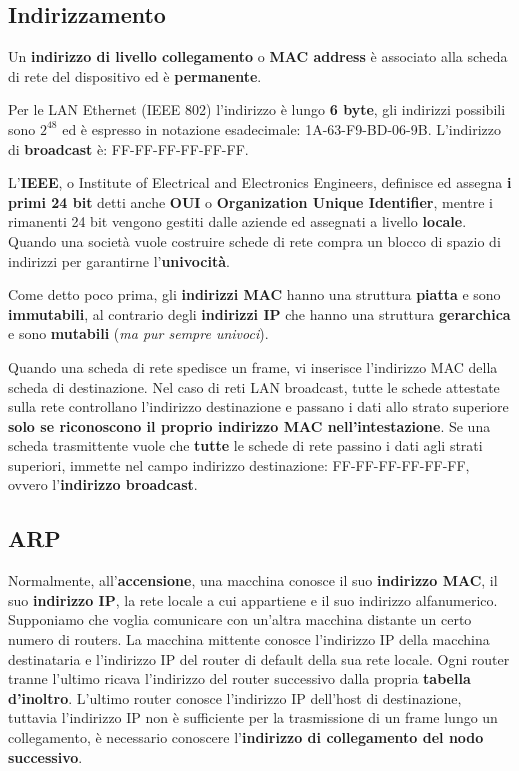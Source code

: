 \documentclass[11pt,a4paper,oneside]{book}
\theoremstyle{definition}
\begin{document}
\pagebreak

\subsection{Indirizzamento}

Un \textbf{indirizzo di livello collegamento} o \textbf{MAC address} è associato alla scheda di rete del dispositivo ed è \textbf{permanente}.

Per le LAN Ethernet (IEEE 802) l'indirizzo è lungo \textbf{6 byte}, gli indirizzi possibili sono $2^{48}$ ed è espresso in notazione esadecimale: 1A-63-F9-BD-06-9B. L'indirizzo di \textbf{broadcast} è: FF-FF-FF-FF-FF-FF.

L'\textbf{IEEE}, o Institute of Electrical and Electronics Engineers, definisce ed assegna \textbf{i primi 24 bit} detti anche \textbf{OUI} o \textbf{Organization Unique Identifier}, mentre i rimanenti 24 bit vengono gestiti dalle aziende ed assegnati a livello \textbf{locale}. Quando una società vuole costruire schede di rete compra un blocco di spazio di indirizzi per garantirne l'\textbf{univocità}.

Come detto poco prima, gli \textbf{indirizzi MAC} hanno una struttura \textbf{piatta} e sono \textbf{immutabili}, al contrario degli \textbf{indirizzi IP} che hanno una struttura \textbf{gerarchica} e sono \textbf{mutabili} (\textit{ma pur sempre univoci}).

Quando una scheda di rete spedisce un frame, vi inserisce l'indirizzo MAC della scheda di destinazione. Nel caso di reti LAN broadcast, tutte le schede attestate sulla rete controllano l'indirizzo destinazione e passano i dati allo strato superiore \textbf{solo se riconoscono il proprio indirizzo MAC nell'intestazione}. Se una scheda trasmittente vuole che \textbf{tutte} le schede di rete passino i dati agli strati superiori, immette nel campo indirizzo destinazione: FF-FF-FF-FF-FF-FF, ovvero
l'\textbf{indirizzo broadcast}.

\subsection{ARP}

Normalmente, all’\textbf{accensione}, una macchina conosce il suo \textbf{indirizzo MAC}, il suo \textbf{indirizzo IP}, la rete locale a cui appartiene e il suo indirizzo alfanumerico.  Supponiamo che voglia comunicare con un'altra macchina distante un certo numero di routers. La macchina mittente conosce l'indirizzo IP della macchina destinataria e l'indirizzo IP del router di default della sua rete locale. Ogni router tranne l'ultimo ricava l'indirizzo del router successivo dalla propria \textbf{tabella d'inoltro}. L'ultimo router conosce l'indirizzo IP dell'host di destinazione, tuttavia l'indirizzo IP non è sufficiente per la trasmissione di un frame lungo un collegamento, è necessario conoscere l'\textbf{indirizzo di collegamento del nodo successivo}.
\end{document}
